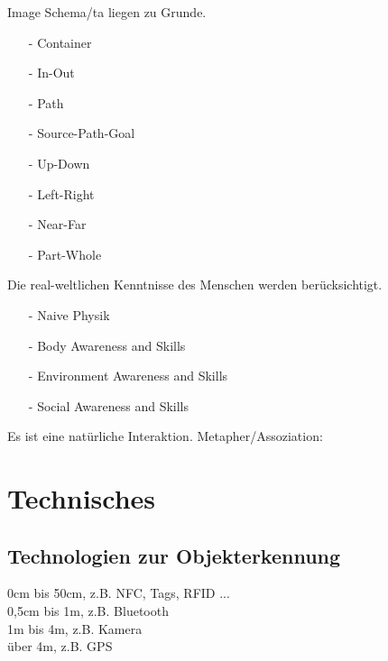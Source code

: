 \checkbox{\imageschemata} Image Schema/ta liegen zu Grunde.
\begin{itemize}
\item[-] \checkbox{\imageSchemaContainer} Container
\item[-] \checkbox{\imageSchemaInOut} In-Out
\item[-] \checkbox{\imageSchemaPath} Path
\item[-] \checkbox{\imageSchemaSourcePathGoal} Source-Path-Goal
\item[-] \checkbox{\imageSchemaUpDown} Up-Down
\item[-] \checkbox{\imageSchemaLeftRight} Left-Right
\item[-] \checkbox{\imageSchemaNearFar} Near-Far
\item[-] \checkbox{\imageSchemaPartWhole} Part-Whole
\end{itemize}

\checkbox{\realworld} Die real-weltlichen Kenntnisse des Menschen werden berücksichtigt.
\begin{itemize}
\item[-] \checkbox{\realworldNaivePhysic} Naive Physik
\item[-] \checkbox{\realworldBodyAwareness} Body Awareness and Skills
\item[-] \checkbox{\realworldEnvironmentAwareness} Environment Awareness and Skills
\item[-] \checkbox{\realworldSocialAwareness} Social Awareness and Skills
\end{itemize}

\checkbox{\metaphor} Es ist eine natürliche Interaktion. Metapher/Assoziation: \metaphordesc


\section*{Technisches}

\subsection*{Technologien zur Objekterkennung}
\checkbox{\technologyObjectIntimate} 0cm bis 50cm, z.B. NFC, Tags, RFID ... \\
\checkbox{\technologyObjectPersonal} 0,5cm bis 1m, z.B. Bluetooth \\
\checkbox{\technologyObjectSocial} 1m bis 4m, z.B. Kamera \\
\checkbox{\technologyObjectPublic} über 4m, z.B. GPS \\

